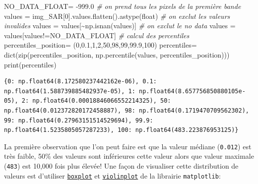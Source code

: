 \documentclass[
]{article}
\newenvironment{Shaded}{}{}
\newcommand{\BuiltInTok}[1]{\textcolor[rgb]{0.00,0.50,0.00}{#1}}
\newcommand{\CommentTok}[1]{\textcolor[rgb]{0.38,0.63,0.69}{\textit{#1}}}
\newcommand{\DecValTok}[1]{\textcolor[rgb]{0.25,0.63,0.44}{#1}}
\newcommand{\FloatTok}[1]{\textcolor[rgb]{0.25,0.63,0.44}{#1}}
\newcommand{\NormalTok}[1]{#1}
\newcommand{\OperatorTok}[1]{\textcolor[rgb]{0.40,0.40,0.40}{#1}}
\begin{document}
\label{81e49d33}
\label{cb19}
\begin{Shaded}
\begin{Highlighting}[]
\NormalTok{NO\_DATA\_FLOAT}\OperatorTok{=} \OperatorTok{{-}}\FloatTok{999.0}
\CommentTok{\# on prend tous les pixels de la première bande}
\NormalTok{values }\OperatorTok{=}\NormalTok{ img\_SAR[}\DecValTok{0}\NormalTok{].values.flatten().astype(}\BuiltInTok{float}\NormalTok{)}
\CommentTok{\# on exclut les valeurs invalides}
\NormalTok{values }\OperatorTok{=}\NormalTok{ values[}\OperatorTok{\textasciitilde{}}\NormalTok{np.isnan(values)]}
\CommentTok{\# on exclut le no data}
\NormalTok{values }\OperatorTok{=}\NormalTok{ values[values}\OperatorTok{!=}\NormalTok{NO\_DATA\_FLOAT]}
\CommentTok{\# calcul des percentiles}
\NormalTok{percentiles\_position}\OperatorTok{=}\NormalTok{ (}\DecValTok{0}\NormalTok{,}\FloatTok{0.1}\NormalTok{,}\DecValTok{1}\NormalTok{,}\DecValTok{2}\NormalTok{,}\DecValTok{50}\NormalTok{,}\DecValTok{98}\NormalTok{,}\DecValTok{99}\NormalTok{,}\FloatTok{99.9}\NormalTok{,}\DecValTok{100}\NormalTok{)}
\NormalTok{percentiles}\OperatorTok{=} \BuiltInTok{dict}\NormalTok{(}\BuiltInTok{zip}\NormalTok{(percentiles\_position, np.percentile(values, percentiles\_position)))}
\BuiltInTok{print}\NormalTok{(percentiles)}
\end{Highlighting}
\end{Shaded}

\begin{verbatim}
{0: np.float64(8.172580237442162e-06), 0.1: np.float64(1.588739885482937e-05), 1: np.float64(8.657756850880105e-05), 2: np.float64(0.00018846066552214325), 50: np.float64(0.012372820172458887), 98: np.float64(0.1719470709562302), 99: np.float64(0.27963151514529694), 99.9: np.float64(1.5235805057287233), 100: np.float64(483.223876953125)}
\end{verbatim}

La première observation que l'on peut faire est que la valeur médiane
(\texttt{0.012}) est très faible, 50\% des valeurs sont inférieures
cette valeur alors que valeur maximale (\texttt{483}) est 10,000 fois
plus élevée! Une façon de visualiser cette distribution de valeurs est
d'utiliser
\href{https://matplotlib.org/stable/api/_as_gen/matplotlib.pyplot.boxplot.html}{\texttt{boxplot}}
et
\href{https://matplotlib.org/stable/api/_as_gen/matplotlib.pyplot.violinplot.html}{\texttt{violinplot}}
de la librairie \texttt{matplotlib}:
\end{document}
